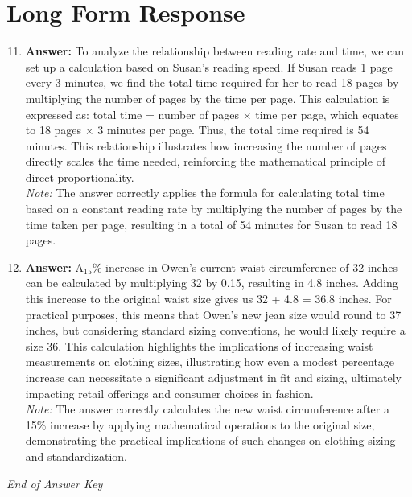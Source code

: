 \documentclass[12pt]{article}
\begin{document}
\section*{Long Form Response}
\begin{enumerate}[label=\arabic*.]
\setcounter{enumi}{10}
\item \textbf{Answer:} To analyze the relationship between reading rate and time, we can set up a calculation based on Susan's reading speed. If Susan reads 1 page every 3 minutes, we find the total time required for her to read 18 pages by multiplying the number of pages by the time per page. This calculation is expressed as: total time = number of pages \ensuremath{\times} time per page, which equates to 18 pages \ensuremath{\times} 3 minutes per page. Thus, the total time required is 54 minutes. This relationship illustrates how increasing the number of pages directly scales the time needed, reinforcing the mathematical principle of direct proportionality.
\\ \textit{Note:} The answer correctly applies the formula for calculating total time based on a constant reading rate by multiplying the number of pages by the time taken per page, resulting in a total of 54 minutes for Susan to read 18 pages.
\item \textbf{Answer:} A$_{15}$\% increase in Owen's current waist circumference of 32 inches can be calculated by multiplying 32 by 0.15, resulting in 4.8 inches. Adding this increase to the original waist size gives us 32 + 4.8 = 36.8 inches. For practical purposes, this means that Owen's new jean size would round to 37 inches, but considering standard sizing conventions, he would likely require a size 36. This calculation highlights the implications of increasing waist measurements on clothing sizes, illustrating how even a modest percentage increase can necessitate a significant adjustment in fit and sizing, ultimately impacting retail offerings and consumer choices in fashion.
\\ \textit{Note:} The answer correctly calculates the new waist circumference after a 15\% increase by applying mathematical operations to the original size, demonstrating the practical implications of such changes on clothing sizing and standardization.
\end{enumerate}

\vfill
\noindent\textit{End of Answer Key}
\end{document}
